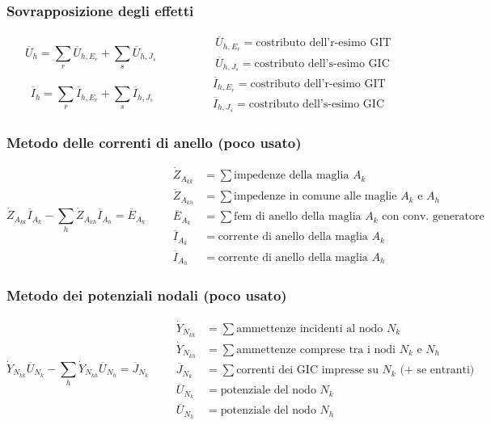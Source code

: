 \documentclass[a4paper]{article}
\begin{document}
\subsubsection*{Sovrapposizione degli effetti}
\[\overline{U}_h = \sum_r \overline{U}_{h,E_r} + \sum_s \overline{U}_{h,J_s} \qquad \qquad \begin{aligned} &\overline{U}_{h,E_r} = \text{costributo dell'r-esimo GIT} \\ &\overline{U}_{h,J_s} = \text{costributo dell's-esimo GIC}\end{aligned}\]
\[\overline{I}_h = \sum_r \overline{I}_{h,E_r} + \sum_s \overline{I}_{h,J_s} \qquad \qquad \begin{aligned} &\overline{I}_{h,E_r} = \text{costributo dell'r-esimo GIT} \\ &\overline{I}_{h,J_s} = \text{costributo dell's-esimo GIC}\end{aligned}\]

\subsubsection*{Metodo delle correnti di anello (poco usato)}
\[\dot{Z}_{A_{kk}} \overline{I}_{A_k} - \sum_h \dot{Z}_{A_{kh}} \overline{I}_{A_h} = \overline{E}_{A_k} \qquad
\begin{aligned}
	\dot{Z}_{A_{kk}} &= \sum \text{impedenze della maglia } A_k \\
	\dot{Z}_{A_{kh}} &= \sum \text{impedenze in comune alle maglie } A_k \text{ e } A_h \\
	\overline{E}_{A_k} &= \sum \text{fem di anello della maglia } A_k \text{ con conv. generatore} \\
	\overline{I}_{A_k} &= \text{corrente di anello della maglia } A_k \\
	\overline{I}_{A_h} &= \text{corrente di anello della maglia } A_h
\end{aligned}\]

\subsubsection*{Metodo dei potenziali nodali (poco usato)}
\[\dot{Y}_{N_{kk}} \overline{U}_{N_k} - \sum_{h} \dot{Y}_{N_{kh}} \overline{U}_{N_h} = \overline{J}_{N_k} \qquad
\begin{aligned}
	\dot{Y}_{N_{kk}} &= \sum \text{ammettenze incidenti al nodo } N_k \\
	\dot{Y}_{N_{kh}} &= \sum \text{ammettenze comprese tra i nodi } N_k \text{ e } N_h \\
	\overline{J}_{N_k} &= \sum \text{correnti dei GIC impresse su } N_k \text{ (+ se entranti)} \\
	\overline{U}_{N_k} &= \text{potenziale del nodo } N_k \\
	\overline{U}_{N_h} &= \text{potenziale del nodo } N_h
\end{aligned}\]
\end{document}
